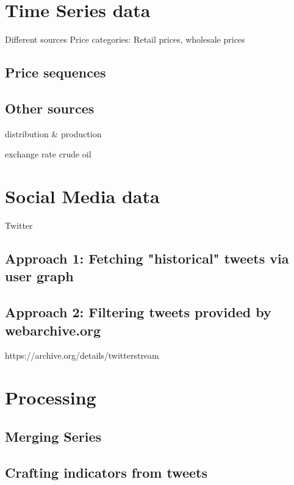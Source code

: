 \section*{Time Series data}
Different sources
Price categories: Retail prices, wholesale prices

\subsection*{Price sequences}

\subsection*{Other sources}
distribution \& production

exchange rate
crude oil


\section*{Social Media data}
Twitter

\subsection*{Approach 1: Fetching "historical" tweets via user graph}

\subsection*{Approach 2: Filtering tweets provided by webarchive.org}
https://archive.org/details/twitterstream

\section{Processing}

\subsection*{Merging Series}

\subsection*{Crafting indicators from tweets}
